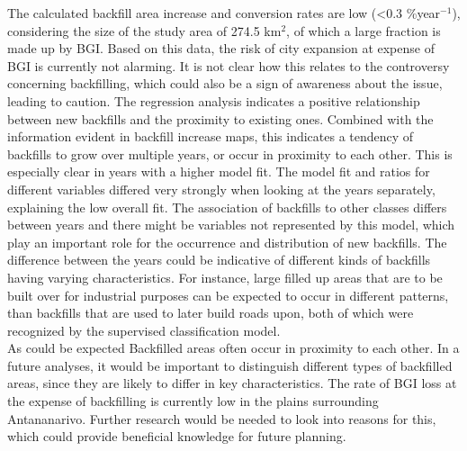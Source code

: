 \documentclass[11pt, A4, oneside]{report}
\begin{document}
The calculated backfill area increase and conversion rates are low (<0.3 \%year$^{-1}$), considering the size of the study area of 274.5 km$^2$, of which a large fraction is made up by BGI. Based on this data, the risk of city expansion at expense of BGI is currently not alarming. It is not clear how this relates to the controversy concerning backfilling, which could also be a sign of awareness about the issue, leading to caution. The regression analysis indicates a positive relationship between new backfills and the proximity to existing ones. Combined with the information evident in backfill increase maps, this indicates a tendency of backfills to grow over multiple years, or occur in proximity to each other. This is especially clear in years with a higher model fit. The model fit and ratios for different variables differed very strongly when looking at the years separately, explaining the low overall fit. The association of backfills to other classes differs between years and there might be variables not represented by this model, which play an important role for the occurrence and distribution of new backfills. The difference between the years could be indicative of different kinds of backfills having varying characteristics. For instance, large filled up areas that are to be built over for industrial purposes can be expected to occur in different patterns, than  backfills that are used to later build roads upon, both of which were recognized by the supervised classification model.\\
As could be expected Backfilled areas often occur in proximity to each other. In a future analyses, it would be important to distinguish different types of backfilled areas, since they are likely to differ in key characteristics.  The rate of BGI loss at the expense of backfilling is currently low in the plains surrounding Antananarivo. Further research would be needed to look into reasons for this, which could provide beneficial knowledge for future planning. %


\end{document}
